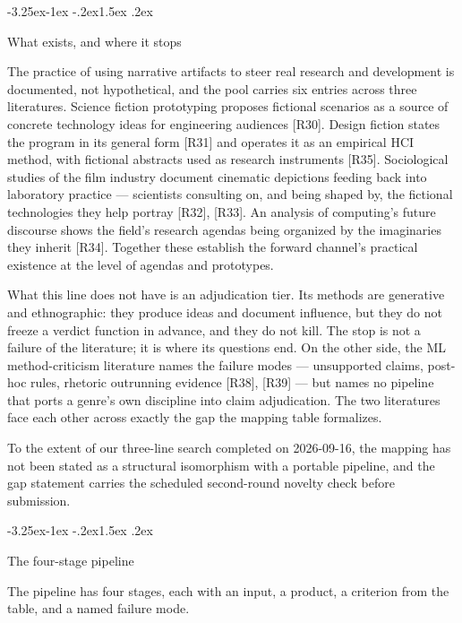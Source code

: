 \documentclass[11pt,a4paper]{article}
\makeatletter
\renewcommand\subsection{\@startsection{subsection}{2}{\z@}%
  {-3.25ex\@plus -1ex \@minus -.2ex}{1.5ex \@plus .2ex}%
  {\normalfont\large\bfseries\raggedright}}
\makeatother
\begin{document}
\subsection{What exists, and where it stops}

The practice of using narrative artifacts to steer real research and development is documented, not hypothetical, and the pool carries six entries across three literatures. Science fiction prototyping proposes fictional scenarios as a source of concrete technology ideas for engineering audiences [R30]. Design fiction states the program in its general form [R31] and operates it as an empirical HCI method, with fictional abstracts used as research instruments [R35]. Sociological studies of the film industry document cinematic depictions feeding back into laboratory practice — scientists consulting on, and being shaped by, the fictional technologies they help portray [R32], [R33]. An analysis of computing's future discourse shows the field's research agendas being organized by the imaginaries they inherit [R34]. Together these establish the forward channel's practical existence at the level of agendas and prototypes.

What this line does not have is an adjudication tier. Its methods are generative and ethnographic: they produce ideas and document influence, but they do not freeze a verdict function in advance, and they do not kill. The stop is not a failure of the literature; it is where its questions end. On the other side, the ML method-criticism literature names the failure modes — unsupported claims, post-hoc rules, rhetoric outrunning evidence [R38], [R39] — but names no pipeline that ports a genre's own discipline into claim adjudication. The two literatures face each other across exactly the gap the mapping table formalizes.

To the extent of our three-line search completed on 2026-09-16, the mapping has not been stated as a structural isomorphism with a portable pipeline, and the gap statement carries the scheduled second-round novelty check before submission.

\subsection{The four-stage pipeline}

The pipeline has four stages, each with an input, a product, a criterion from the table, and a named failure mode.
\end{document}
